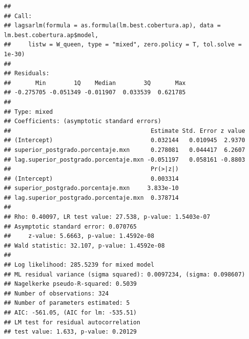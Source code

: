 \documentclass[12pt,]{book}
\newenvironment{Shaded}{\begin{snugshade}}{\end{snugshade}}
\newcommand{\KeywordTok}[1]{\textcolor[rgb]{0.13,0.29,0.53}{\textbf{#1}}}
\newcommand{\DataTypeTok}[1]{\textcolor[rgb]{0.13,0.29,0.53}{#1}}
\newcommand{\FloatTok}[1]{\textcolor[rgb]{0.00,0.00,0.81}{#1}}
\newcommand{\StringTok}[1]{\textcolor[rgb]{0.31,0.60,0.02}{#1}}
\newcommand{\CommentTok}[1]{\textcolor[rgb]{0.56,0.35,0.01}{\textit{#1}}}
\newcommand{\OperatorTok}[1]{\textcolor[rgb]{0.81,0.36,0.00}{\textbf{#1}}}
\newcommand{\NormalTok}[1]{#1}
\begin{document}
\begin{Shaded}
\end{Shaded}

\begin{verbatim}
## 
## Call:
## lagsarlm(formula = as.formula(lm.best.cobertura.ap), data = lm.best.cobertura.ap$model, 
##     listw = W_queen, type = "mixed", zero.policy = T, tol.solve = 1e-30)
## 
## Residuals:
##       Min        1Q    Median        3Q       Max 
## -0.275705 -0.051349 -0.011907  0.033539  0.621785 
## 
## Type: mixed 
## Coefficients: (asymptotic standard errors) 
##                                        Estimate Std. Error z value
## (Intercept)                            0.032144   0.010945  2.9370
## superior_postgrado.porcentaje.mxn      0.278081   0.044417  6.2607
## lag.superior_postgrado.porcentaje.mxn -0.051197   0.058161 -0.8803
##                                        Pr(>|z|)
## (Intercept)                            0.003314
## superior_postgrado.porcentaje.mxn     3.833e-10
## lag.superior_postgrado.porcentaje.mxn  0.378714
## 
## Rho: 0.40097, LR test value: 27.538, p-value: 1.5403e-07
## Asymptotic standard error: 0.070765
##     z-value: 5.6663, p-value: 1.4592e-08
## Wald statistic: 32.107, p-value: 1.4592e-08
## 
## Log likelihood: 285.5239 for mixed model
## ML residual variance (sigma squared): 0.0097234, (sigma: 0.098607)
## Nagelkerke pseudo-R-squared: 0.5039 
## Number of observations: 324 
## Number of parameters estimated: 5 
## AIC: -561.05, (AIC for lm: -535.51)
## LM test for residual autocorrelation
## test value: 1.633, p-value: 0.20129
\end{verbatim}

\begin{Shaded}
\end{Shaded}
\end{document}
